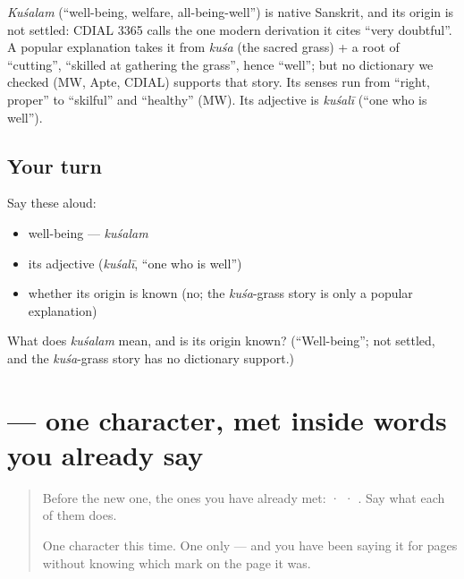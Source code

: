 \begin{cousinweb}
\emph{Kuśalam} (\textquotedblleft{}well-being, welfare, all-being-well\textquotedblright{}) is native Sanskrit, and its origin is not settled: CDIAL 3365 calls the one modern derivation it cites \textquotedblleft{}very doubtful\textquotedblright{}. A popular explanation takes it from \emph{kuśa} (the sacred grass) + a root of \textquotedblleft{}cutting\textquotedblright{}, \textquotedblleft{}skilled at gathering the grass\textquotedblright{}, hence \textquotedblleft{}well\textquotedblright{}; but no dictionary we checked (MW, Apte, CDIAL) supports that story. Its senses run from \textquotedblleft{}right, proper\textquotedblright{} to \textquotedblleft{}skilful\textquotedblright{} and \textquotedblleft{}healthy\textquotedblright{} (MW). Its adjective is \emph{kuśalī} (\textquotedblleft{}one who is well\textquotedblright{}).
\end{cousinweb}

\subsection*{Your turn}
Say these aloud:

\begin{itemize}
\raggedright
  \item well-being — \emph{kuśalam}
  \item its adjective (\emph{kuśalī}, \textquotedblleft{}one who is well\textquotedblright{})
  \item whether its origin is known (no; the \emph{kuśa}-grass story is only a popular explanation)
\end{itemize}

\begin{tcolorbox}[breakable,colback=teal!4,colframe=teal!35!black,title={Before you move on}]
What does \emph{kuśalam} mean, and is its origin known? (\textquotedblleft{}Well-being\textquotedblright{}; not settled, and the \emph{kuśa}-grass story has no dictionary support.)
\end{tcolorbox}
\section[\texorpdfstring{\sk{म} (ma)}{म (ma)}]{ — one character, met inside words you already say}

\label{lesson:SA-S01-letter-ma}



\begin{quote}
Before the new one, the ones you have already met:  ·  · . Say what each of them does.

One character this time. One only — and you have been saying it for pages without knowing which mark on the page it was.
\end{quote}

